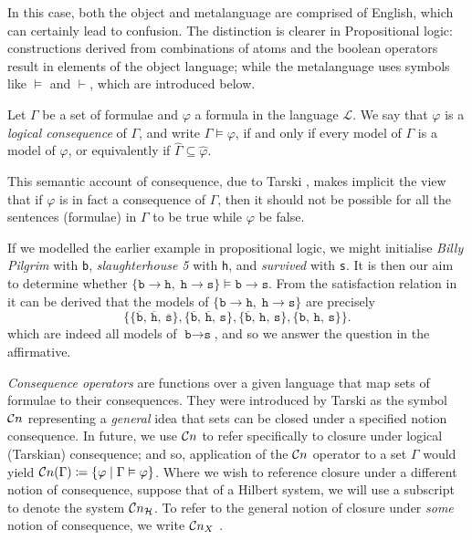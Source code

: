 In this case, both the object and metalanguage are comprised of English, which can certainly lead to confusion. The distinction is clearer in Propositional logic: constructions derived from combinations of atoms and the boolean operators result in elements of the object language; while the metalanguage uses symbols like $\vDash$ and $\vdash$, which are introduced below.

\begin{definition}
     \label{definition:logical-consequence}
     Let $\Gamma$ be a set of formulae and $\varphi$ a formula in the language $\mathcal{L}$. We say that $\varphi$ is a \textit{logical consequence} of $\Gamma$, and write $\Gamma \vDash \varphi$, if and only if every model of $\Gamma$ is a model of $\varphi$, or equivalently if $\hat{\Gamma} \subseteq \hat{\varphi}$.
\end{definition}

This semantic account of consequence, due to Tarski \cite[p. 417]{tarski1936consequence}, makes implicit the view that if $\varphi$ is in fact a consequence of $\Gamma$, then it should not be possible for all the sentences (formulae) in $\Gamma$ to be true while $\varphi$ be false.

\begin{example}
     \label{example-logical-consequence}
     If we modelled the earlier example in propositional logic, we might initialise \textit{Billy Pilgrim} with \texttt{b}, \textit{slaughterhouse 5} with \texttt{h}, and \textit{survived} with \texttt{s}. It is then our aim to determine whether $\{\texttt{b} \rightarrow \texttt{h},\; \texttt{h} \rightarrow \texttt{s}\} \vDash \texttt{b} \rightarrow \texttt{s}$. From the satisfaction relation in  it can be derived that the models of $\{\texttt{b} \rightarrow \texttt{h},\; \texttt{h} \rightarrow \texttt{s}\}$ are precisely
\[
     \bigl\{
       \{\overline{\texttt{b}},\,\overline{\texttt{h}},\,\overline{\texttt{s}}\},
       \{\overline{\texttt{b}},\,\overline{\texttt{h}},\,{\texttt{s}}\},
       \{\overline{\texttt{b}},\,{\texttt{h}},\,{\texttt{s}}\},
       \{{\texttt{b}},\,{\texttt{h}},\,{\texttt{s}}\}
     \bigr\}.
\]
which are indeed all models of $\texttt{b} \rightarrow \texttt{s}$, and so we answer the question in the affirmative.
\end{example}

\textit{Consequence operators} are functions over a given language that map sets of formulae to their consequences. They were introduced by Tarski \cite[p. 84]{tarski1936operator} as the symbol $\mathcal{C}n$ representing a \textit{general} idea that sets can be closed under a specified notion consequence. In future, we use $\mathcal{C}n$ to refer specifically to closure under logical (Tarskian) consequence; and so, application of the $\mathcal{C}n$ operator to a set $\Gamma$ would yield $\mathcal{C}n (\Gamma) \coloneqq \{\varphi \mid \Gamma \vDash \varphi\}$. Where we wish to reference closure under a different notion of consequence, suppose that of a Hilbert system, we will use a subscript to denote the system $\mathcal{C}n_\mathcal{H}$. To refer to the general notion of closure under \textit{some} notion of consequence, we write $\mathcal{C}n_X$ \cite[p. 4]{citkin2022consequence}.

